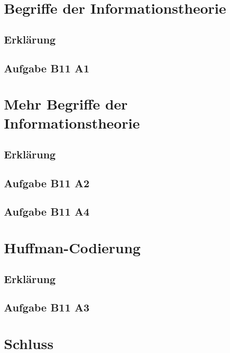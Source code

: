 




\section{Begriffe der Informationstheorie}
\subsection{Erklärung}
\subsection{Aufgabe B11 A1}

\section{Mehr Begriffe der Informationstheorie}
\subsection{Erklärung}
\subsection{Aufgabe B11 A2}
\subsection{Aufgabe B11 A4}

\section{Huffman-Codierung}
\subsection{Erklärung}
\subsection{Aufgabe B11 A3}

\section{Schluss}

